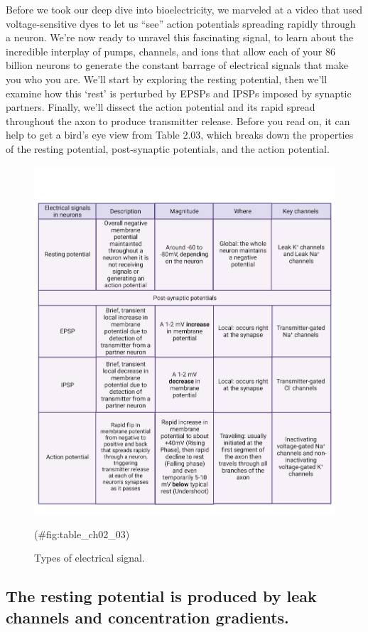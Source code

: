 \documentclass[
]{book}
\begin{document}
Before we took our deep dive into bioelectricity, we marveled at a video that used voltage-sensitive dyes to let us ``see'' action potentials spreading rapidly through a neuron. We're now ready to unravel this fascinating signal, to learn about the incredible interplay of pumps, channels, and ions that allow each of your 86 billion neurons to generate the constant barrage of electrical signals that make you who you are. We'll start by exploring the resting potential, then we'll examine how this `rest' is perturbed by EPSPs and IPSPs imposed by synaptic partners. Finally, we'll dissect the action potential and its rapid spread throughout the axon to produce transmitter release. Before you read on, it can help to get a bird's eye view from Table 2.03, which breaks down the properties of the resting potential, post-synaptic potentials, and the action potential.

\begin{figure}

{\centering \includegraphics[width=0.8\linewidth]{images/ch02/table_02_03} 

}

\caption{Types of electrical signal.}(\#fig:table_ch02_03)
\end{figure}

\hypertarget{the-resting-potential-is-produced-by-leak-channels-and-concentration-gradients.}{%
\subsection{The resting potential is produced by leak channels and concentration gradients.}\label{the-resting-potential-is-produced-by-leak-channels-and-concentration-gradients.}}
\end{document}
